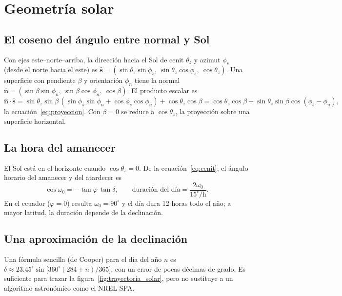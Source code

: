 \documentclass[11pt,a4paper]{article}
\begin{document}
\section{Geometría solar}
\label{sec:der-solar}

\subsection{El coseno del ángulo entre normal y Sol}

Con ejes este--norte--arriba, la dirección hacia el Sol de cenit $\theta_z$ y azimut $\phi_s$ (desde el norte
hacia el este) es $\hat{\mathbf s}=(\sin\theta_z\sin\phi_s,\ \sin\theta_z\cos\phi_s,\ \cos\theta_z)$. Una superficie con
pendiente $\beta$ y orientación $\phi_n$ tiene la normal
$\hat{\mathbf n}=(\sin\beta\sin\phi_n,\ \sin\beta\cos\phi_n,\ \cos\beta)$. El producto escalar es
\[
  \hat{\mathbf n}\!\cdot\!\hat{\mathbf s}=\sin\theta_z\sin\beta\,(\sin\phi_s\sin\phi_n+\cos\phi_s\cos\phi_n)+\cos\theta_z\cos\beta
  =\cos\theta_z\cos\beta+\sin\theta_z\sin\beta\cos(\phi_s-\phi_n),
\]
la ecuación~\eqref{eq:proyeccion}. Con $\beta=0$ se reduce a $\cos\theta_z$, la proyección sobre una superficie
horizontal.

\subsection{La hora del amanecer}

El Sol está en el horizonte cuando $\cos\theta_z=0$. De la ecuación~\eqref{eq:cenit}, el ángulo horario del
amanecer y del atardecer es
\begin{equation}
  \cos\omega_0=-\tan\varphi\,\tan\delta,
  \qquad
  \text{duración del día}=\frac{2\omega_0}{15^\circ/\text{h}} .
\end{equation}
En el ecuador ($\varphi=0$) resulta $\omega_0=90^\circ$ y el día dura 12 horas todo el año; a mayor latitud, la
duración depende de la declinación.

\subsection{Una aproximación de la declinación}

Una fórmula sencilla (de Cooper) para el día del año $n$ es
$\delta\approx23.45^\circ\sin\!\bigl[360^\circ(284+n)/365\bigr]$, con un error de pocas décimas de grado. Es
suficiente para trazar la figura~\ref{fig:trayectoria_solar}, pero no sustituye a un algoritmo astronómico como el
NREL SPA.
\end{document}
